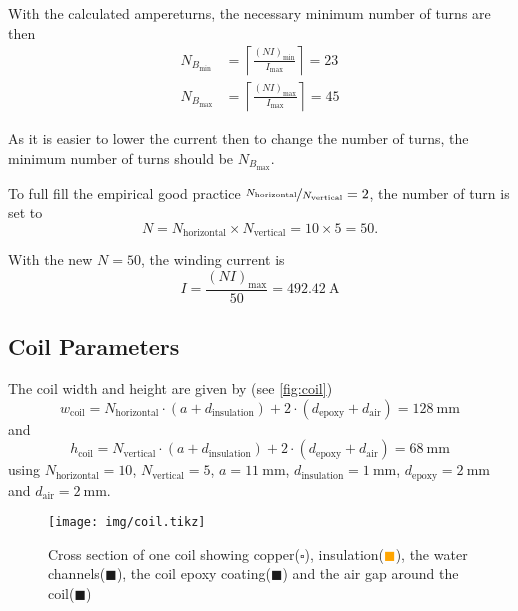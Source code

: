 \documentclass[10pt,a4paper,noendnumber=true]{scrartcl}
\begin{document}
With the calculated ampereturns, the necessary minimum number of turns are then
\begin{align}
    N_{B_\text{min}} &= \left\lceil\frac{(NI)_\text{min}}{I_\text{max}}\right\rceil = 23\\
    N_{B_\text{max}} &= \left\lceil\frac{(NI)_\text{max}}{I_\text{max}}\right\rceil = 45
\end{align}

As it is easier to lower the current then to change the number of turns, the minimum number of turns should be $N_{B_\text{max}}$.

To full fill the empirical good practice $\nicefrac{N_\text{horizontal}}{N_\text{vertical}}=2$, the number of turn is set to
\begin{equation}
    N=N_\text{horizontal} \times N_\text{vertical} = 10 \times 5 = 50.
\end{equation}

With the new $N=50$, the winding current is
\begin{equation}
    I = \frac{(NI)_\text{max}}{50} = \SI{492.42}{\ampere}
\end{equation}

\subsection{Coil Parameters}
The coil width and height are given by (see \autoref{fig:coil})
\begin{equation}
    w_\text{coil}=N_\text{horizontal} \cdot (a+d_\text{insulation}) + 2\cdot(d_\text{epoxy} + d_\text{air}) = \SI{128}{\mm}
\end{equation}
and
\begin{equation}
    h_\text{coil}=N_\text{vertical} \cdot (a+d_\text{insulation}) + 2\cdot(d_\text{epoxy} + d_\text{air}) = \SI{68}{\mm}
\end{equation}
using $N_\text{horizontal}=10$, $N_\text{vertical}=5$, $a=\SI{11}{\mm}$, $d_\text{insulation}=\SI{1}{\mm}$, $d_\text{epoxy}=\SI{2}{\mm}$ and $d_\text{air}=\SI{2}{\mm}$.

\begin{figure}[H]
\centering
\texttt{[image: img/coil.tikz]}
\caption{Cross section of one coil showing copper(\textcolor{black}{$\square$}), insulation(\textcolor{orange}{$\blacksquare$}), 
the water channels(\textcolor{blue!30}{$\blacksquare$}),
the coil epoxy coating(\textcolor{red!30}{$\blacksquare$}) and
the air gap around the coil(\textcolor{green!30}{$\blacksquare$})}
\label{fig:coil}
\end{figure}
\end{document}
